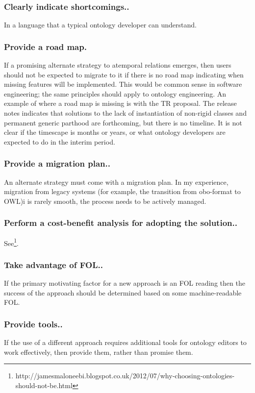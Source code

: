 \documentclass{bioinfo}
\begin{document}
\subsubsection{Clearly indicate shortcomings..} In a language that a
typical ontology developer can understand.

\subsubsection{Provide a road map.} If a promising alternate strategy
to atemporal relations emerges, then users should not be expected to
migrate to it if there is no road map indicating when missing features
will be implemented. This would be common sense in software
engineering; the same principles should apply to ontology engineering.
An example of where a road map is missing is with the TR proposal. The
release notes indicates that solutions to the lack of instantiation of
non-rigid classes and permanent generic parthood are forthcoming, but
there is no timeline. It is not clear if the timescape is months or
years, or what ontology developers are expected to do in the interim
period.

\subsubsection{Provide a migration plan..} An alternate strategy must
come with a migration plan. In my experience, migration from legacy
systems (for example, the transition from obo-format to OWL)i is
rarely smooth, the process needs to be actively managed.

\subsubsection{Perform a cost-benefit analysis for adopting the
  solution..}
See\footnote{http://jamesmaloneebi.blogspot.co.uk/2012/07/why-choosing-ontologies-should-not-be.html}.


\subsubsection{Take advantage of FOL..} If the primary motivating
factor for a new approach is an FOL reading then the success of the
approach should be determined based on some machine-readable FOL.

\subsubsection{Provide tools..} If the use of a different approach
requires additional tools for ontology editors to work effectively,
then provide them, rather than promise them.
\end{document}
